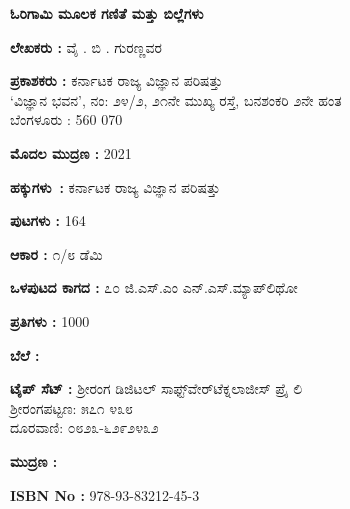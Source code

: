 \newpage

{\bfseries ಓರಿಗಾಮಿ ಮೂಲಕ ಗಣಿತೆ ಮತ್ತು ಬಿಲ್ಲೆಗಳು}

\begin{center}
{\rm {\bfseries ಲೇಖಕರು  :} ವೈ . ಬಿ . ಗುರಣ್ಣವರ}


{\rm {\bfseries ಪ್ರಕಾಶಕರು :} ಕರ್ನಾಟಕ ರಾಜ್ಯ ವಿಜ್ಞಾನ ಪರಿಷತ್ತು \\  ‘ವಿಜ್ಞಾನ ಭವನ’, ನಂ: ೨೪/೨, ೨೧ನೇ ಮುಖ್ಯ ರಸ್ತೆ, ಬನಶಂಕರಿ ೨ನೇ ಹಂತ\\   ಬೆಂಗಳೂರು :  560 070 }


{\rm {\bfseries ಮೊದಲ ಮುದ್ರಣ :} 2021}


{\rm {\bfseries ಹಕ್ಕುಗಳು~:} ಕರ್ನಾಟಕ ರಾಜ್ಯ ವಿಜ್ಞಾನ ಪರಿಷತ್ತು}


{\rm {\bfseries ಪುಟಗಳು :} 164}


{\rm {\bfseries ಆಕಾರ :} ೧/೮ ಡೆಮಿ}


{\rm {\bfseries ಒಳಪುಟದ ಕಾಗದ :} ೭೦ ಜಿ.ಎಸ್​.ಎಂ ಎನ್​.ಎಸ್​.ಮ್ಯಾಪ್​ಲಿಥೋ}


{\rm {\bfseries ಪ್ರತಿಗಳು :} 1000}


{\rm {\bfseries ಬೆಲೆ :}  \rupee\ }


{\rm {\bfseries ಟೈಪ್​ ಸೆಟ್ :}   ಶ್ರೀರಂಗ ಡಿಜಿಟಲ್​ ಸಾಫ್ಟ್​ವೇರ್​ ಟೆಕ್ನಲಾಜೀಸ್​ ಪ್ರೈ ಲಿ  \\  ಶ್ರೀರಂಗಪಟ್ಟಣ: ೫೭೧ ೪೩೮\\ ದೂರವಾಣಿ: ೦೮೨೩-೬೨೯೨೪೩೨ }


{\rm {\bfseries ಮುದ್ರಣ :}  }


{\rm {\bfseries ISBN No :} 978-93-83212-45-3}


\end{center}






